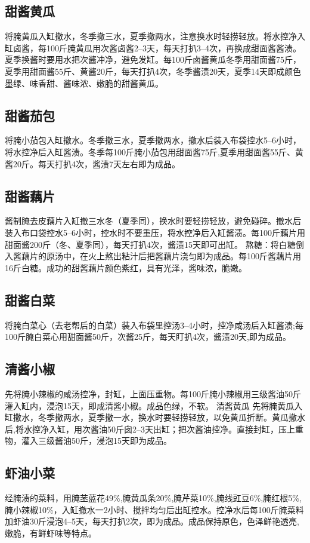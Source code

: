 \documentclass{ctexbook}
\begin{document}
\subsection{甜酱黄瓜}
将腌黄瓜入缸撤水，冬季撤三水，夏季撤两水，注意换水时轻捞轻放。将水控净入缸卤酱，每100斤腌黄瓜用次酱卤酱2--3天，每天打扒3--4次，再换成甜面酱酱渍。夏季换酱时要用水把次酱冲净，避免发缸。每100斤卤酱黄瓜冬季用甜面酱75斤，夏季用甜面酱55斤、黄酱20斤，每天打扒4次，冬季酱渍20天，夏季14天即成颜色墨绿、味香甜、酱味浓、嫩脆的甜酱黄瓜。


\subsection{甜酱茄包}
将腌小茄包入缸撤水。冬季撤三水，夏季撤两水，撤水后装入布袋控水5--6小时，将水控净后入缸酱渍。冬季每100斤腌小茄包用甜面酱75斤,夏季用甜面酱55斤、黄酱20斤。每天打扒4次，酱渍7天左右即为成品。
\subsection{甜酱藕片}
酱制腌去皮藕片入缸撤三水冬（夏季同），换水时要轻捞轻放，避免碰碎。撤水后装入布口袋控水5--6小时，控水时不要重压，将水控净后入缸酱渍。每100斤藕片用甜面酱200斤（冬、夏季同），每天打扒4次，酱渍15天即可出缸。
熬糖：将白糖倒入酱藕片的原汤中，在火上熬出粘汁后把酱藕片浇匀即为成品。每100斤酱藕片用16斤白糖。成功的甜酱藕片颜色紫红，具有光泽，酱味浓，脆嫩。
\subsection{甜酱白菜}
将腌白菜心（去老帮后的白菜）装入布袋里控汤3--4小时，控净咸汤后入缸酱渍;每100斤腌白菜心用甜面酱50斤，次酱25斤，每天盯扒4次，酱渍20天,即为成品。
\subsection{清酱小椒}
先将腌小辣椒的咸汤控净，封缸，上面压重物。每100斤腌小辣椒用三级酱油50斤灌入缸内，浸泡15天，即成清酱小椒。成品色绿，不软。
清酱黄瓜
先将腌黄瓜入缸撒水，冬季撤两水，夏季撤一水，换水时要轻捞轻放，以免黄瓜折断。黄瓜撤水后,将水控净入缸，用次酱油50斤囱2--3天出缸；把次酱油控净。直接封缸，压上重物，灌入三级酱油50斤，浸泡15天即为成品。
\subsection{虾油小菜}
经腌渍的菜料，用腌苤蓝花49\%,腌黄瓜条20\%,腌芹菜10\%,腌线豇豆6\%,腌红根5\%,腌小辣椒10\%，入缸撤水一2小时、搅拌均匀后出缸控水。控净水后每100斤腌菜料加虾油30斤浸泡4--5天，每天打扒2次，即为成品。成品保持原色，色泽鲜艳透亮,嫩脆，有鲜虾味等特点。
\end{document}
